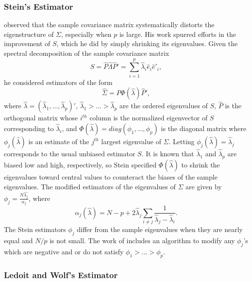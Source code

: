 \subsubsection{Stein's Estimator}

\cite{stein1975estimation} observed that the sample covariance matrix systematically distorts the eigenstructure of $\Sigma$, especially when $p$ is large. His work spurred efforts in the improvement of $S$, which he did by simply shrinking its eigenvalues. Given the spectral decomposition of the sample covariance matrix
\[
S = \hat{P} \hat{\Lambda} \hat{P}' = \sum_{i = 1}^p \hat{\lambda}_i \hat{e}_i \hat{e}'_i,
\]
\noindent
he considered estimators of the form
\begin{equation}\label{eq:stein-eigen-estimator}
\hat{\Sigma} = \hat{P} \Phi\left(\hat{\lambda}\right) \hat{P}',
\end{equation}
\noindent
where $\hat{\lambda} = \left(\hat{\lambda}_1, \dots, \hat{\lambda}_p\right)'$, $\hat{\lambda}_1 > \dots > \hat{\lambda}_p$ are the ordered eigenvalues of $S$, $\hat{P}$ is the orthogonal matrix whose $i^{th}$ column is the normalized eigenvector of $S$ corresponding to $\hat{\lambda}_i$, and $\Phi\left(\hat{\lambda}\right) = diag\left(\phi_1,\dots, \phi_p \right)$ is the diagonal matrix where $\phi_j\left(\hat{\lambda} \right)$ is an estimate of the $j^{th}$ largest eigenvalue of $\Sigma$. Letting $\phi_j\left(\hat{\lambda} \right) = \hat{\lambda}_j$ corresponds to the usual unbiased estimator $S$. It is known that $\hat{\lambda}_1$ and $\hat{\lambda}_p$ are biased low and high, respectively, so Stein specified $\Phi\left(\hat{\lambda}\right)$ to shrink the eigenvalues toward central values to counteract the biases of the sample eigenvalues. The modified estimators of the eigenvalues of $\Sigma$ are given by $\phi_j = \frac{N \hat{\lambda_j}}{\alpha_j}$, where
\begin{equation}\label{eq:stein-eigen-estimator}
\alpha_j\left(\hat{\lambda}\right) = N - p + 2\hat{\lambda}_j \sum_{i \ne j} \frac{1}{\hat{\lambda}_j - \hat{\lambda}_i}.
\end{equation}
\noindent
The Stein estimators $\phi_j$ differ from the sample eigenvalues when they are nearly equal and $N/p$ is not small. The work of \cite{lin1985monte} includes an algorithm to modify any $\phi_j$'s which are negative and or do not satisfy $\phi_1 > \dots > \phi_p$.

\subsubsection{Ledoit and Wolf's Estimator}

